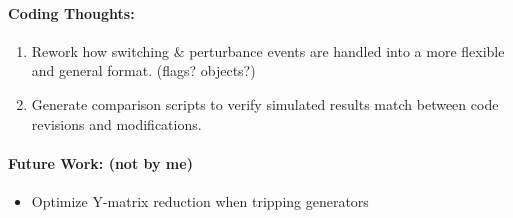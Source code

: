 \documentclass[12pt]{article}
\begin{document}
\begin{multicols}{2}
	
\paragraph{Coding Thoughts:} 
	\begin{enumerate}

		\itemsep 0em 
		\item Rework how switching \& perturbance events are handled into a more flexible and general format. (flags? objects?)
		\item Generate comparison scripts to verify simulated results match  between code revisions and modifications.

	\end{enumerate}


\paragraph{Future Work: (not by me)}
	\begin{itemize}
	\item Optimize Y-matrix reduction when tripping generators
				

\end{itemize}
\end{multicols}
\end{document}
